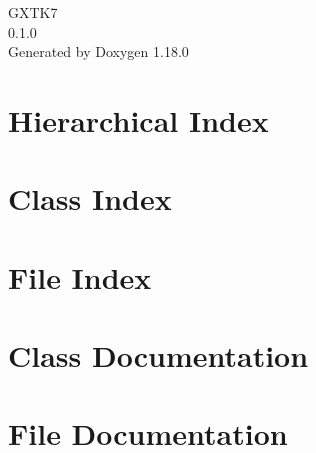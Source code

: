 \documentclass[twoside]{book}
\newcommand{\+}{\discretionary{\mbox{\scriptsize$\hookleftarrow$}}{}{}}
\newcommand{\clearemptydoublepage}{%
    \newpage{\pagestyle{empty}\cleardoublepage}%
  }
\begin{document}
  \raggedbottom
    \hypersetup{pageanchor=false,
                bookmarksnumbered=true,
                pdfencoding=unicode
               }
  \begin{titlepage}
  \vspace*{7cm}
  \begin{center}%
  {\Large GXTK7}\\
  [1ex]\large 0.\+1.\+0 \\
  \vspace*{1cm}
  {\large Generated by Doxygen 1.18.0}\\
  \end{center}
  \end{titlepage}
  \clearemptydoublepage
  \tableofcontents
  \clearemptydoublepage
  \hypersetup{pageanchor=true}

\chapter{Hierarchical Index}

\chapter{Class Index}

\chapter{File Index}

\chapter{Class Documentation}



\chapter{File Documentation}



  \backmatter
  \newpage
  \clearemptydoublepage
  \printindex
\end{document}
